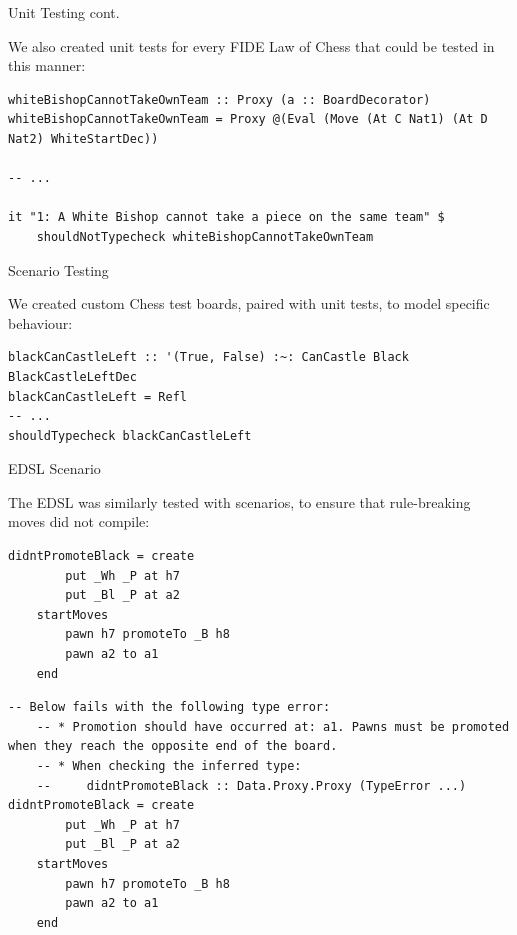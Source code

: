 \documentclass{beamer}
\begin{document}
\begin{frame}[fragile]{Unit Testing cont.}

We also created unit tests for every FIDE Law of Chess that could be tested in this manner:

\begin{lstlisting}
whiteBishopCannotTakeOwnTeam :: Proxy (a :: BoardDecorator)
whiteBishopCannotTakeOwnTeam = Proxy @(Eval (Move (At C Nat1) (At D Nat2) WhiteStartDec))

-- ...

it "1: A White Bishop cannot take a piece on the same team" $
    shouldNotTypecheck whiteBishopCannotTakeOwnTeam
\end{lstlisting}
    
\end{frame}

\begin{frame}[fragile]{Scenario Testing}
    
We created custom Chess test boards, paired with unit tests, to model specific behaviour: %

\begin{figure}[h]
    \centering
    \scalebox{0.55}{\showboard}
    \label{blackcastleleft}
\end{figure}

\begin{lstlisting}
blackCanCastleLeft :: '(True, False) :~: CanCastle Black BlackCastleLeftDec
blackCanCastleLeft = Refl
-- ...
shouldTypecheck blackCanCastleLeft
\end{lstlisting}

\end{frame}

\begin{frame}[fragile]{EDSL Scenario}

The EDSL was similarly tested with scenarios, to ensure that rule-breaking moves did not compile:

\begin{overprint}
    
\begin{lstlisting}
didntPromoteBlack = create
        put _Wh _P at h7
        put _Bl _P at a2
    startMoves
        pawn h7 promoteTo _B h8
        pawn a2 to a1
    end
\end{lstlisting}

\begin{lstlisting}
-- Below fails with the following type error:
    -- * Promotion should have occurred at: a1. Pawns must be promoted when they reach the opposite end of the board.
    -- * When checking the inferred type:
    --     didntPromoteBlack :: Data.Proxy.Proxy (TypeError ...)
didntPromoteBlack = create
        put _Wh _P at h7
        put _Bl _P at a2
    startMoves
        pawn h7 promoteTo _B h8
        pawn a2 to a1
    end
\end{lstlisting}

\end{overprint}
    
\end{frame}
\end{document}
